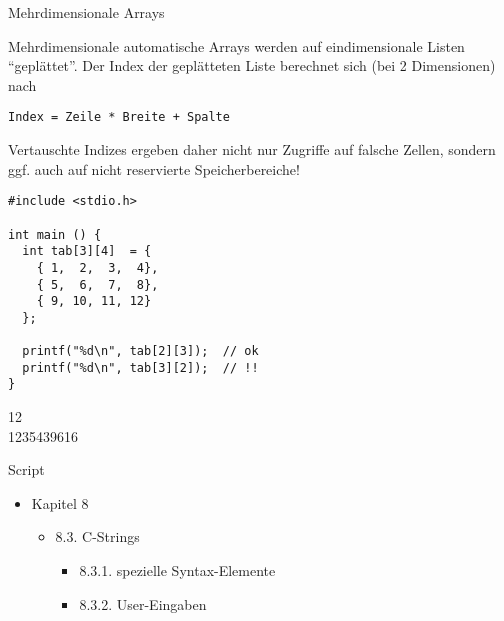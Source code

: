 \begin{frame}[fragile]{Mehrdimensionale Arrays}
%
%
\begin{warnbox}
\footnotesize
Mehrdimensionale automatische Arrays werden auf eindimensionale Listen \enquote{geplättet}. Der Index der geplätteten Liste berechnet sich (bei 2 Dimensionen) nach
\begin{center}
\texttt{\scriptsize Index = Zeile * Breite + Spalte}
\end{center}
Vertauschte Indizes ergeben daher nicht nur Zugriffe auf falsche Zellen, sondern ggf. auch auf nicht reservierte Speicherbereiche!
\end{warnbox}
%
\begin{codebox}
\begin{verbatim}
#include <stdio.h>

int main () {
  int tab[3][4]  = {
    { 1,  2,  3,  4},
    { 5,  6,  7,  8},
    { 9, 10, 11, 12}
  };
  
  printf("%d\n", tab[2][3]);  // ok
  printf("%d\n", tab[3][2]);  // !!
}
\end{verbatim}
\end{codebox}
%
%
\begin{cmdbox}[Ausgabe]
\footnotesize
12\\
1235439616
\end{cmdbox}
%
\end{frame}


\begin{frame}{Script}
%
\begin{itemize}
\item Kapitel 8
	\begin{itemize}
	\item 8.3. C-Strings
		\begin{itemize}
		\item 8.3.1. spezielle Syntax-Elemente
		\item 8.3.2. User-Eingaben
		\end{itemize}
	\end{itemize}
\end{itemize}
%
\end{frame}


